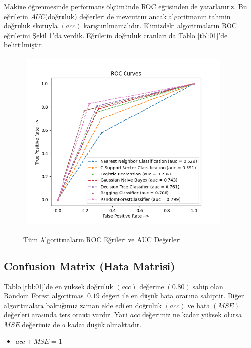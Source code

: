 \documentclass[conference]{IEEEtran}
\begin{document}
\quad Makine öğrenmesinde performans ölçümünde ROC eğrisinden de yararlanırız. Bu eğrilerin $AUC$(doğruluk) değerleri de mevcuttur ancak algoritmanın tahmin doğruluk skoruyla $(acc)$ karıştırılmamalıdır\cite{22}. Elimizdeki algoritmaların ROC eğrilerini Şekil \ref{fig:09}'da verdik. Eğrilerin doğruluk oranları da Tablo \ref{tbl:01}'de belirtilmiştir.

\begin{figure}[!h]
	\centering
	\begin{center}
		\begin{tabular}{cc}
			\includegraphics[scale=0.575]{pictures/pic_09.png}&
		\end{tabular}
	\end{center}
	\caption{Tüm Algoritmaların ROC Eğrileri ve AUC Değerleri}
	\label{fig:09}
\end{figure}

\subsection{\textbf{Confusion Matrix (Hata Matrisi)}}

\quad Tablo \ref{tbl:01}'de en yüksek doğruluk $(acc)$ değerine $(0.80)$ sahip olan Random Forest algoritması $0.19$ değeri ile en düşük hata oranına sahiptir. Diğer algoritmalara baktığımız zaman elde edilen doğruluk $(acc)$ ve hata $(MSE)$ değerleri arasında ters orantı vardır. Yani $acc$ değerimiz ne kadar yüksek olursa $MSE$ değerimiz de o kadar düşük olmaktadır.
\begin{itemize}
\item $acc + MSE = 1$
\end{itemize}
\end{document}
